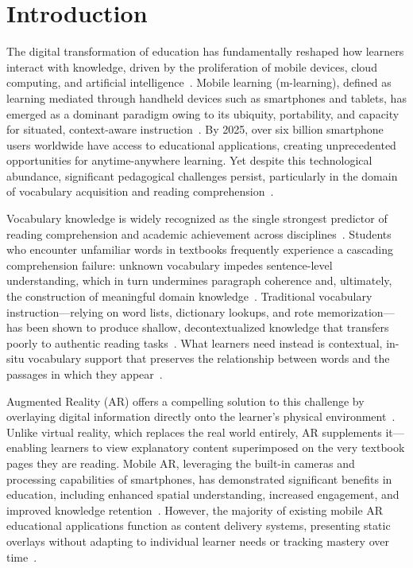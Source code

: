 \section{Introduction}
\label{sec:introduction}

The digital transformation of education has fundamentally reshaped how learners interact with knowledge, driven by the proliferation of mobile devices, cloud computing, and artificial intelligence~\cite{Crompton2017,Sharples2015}. Mobile learning (m-learning), defined as learning mediated through handheld devices such as smartphones and tablets, has emerged as a dominant paradigm owing to its ubiquity, portability, and capacity for situated, context-aware instruction~\cite{Kukulska2009,Chee2017}. By 2025, over six billion smartphone users worldwide have access to educational applications, creating unprecedented opportunities for anytime-anywhere learning. Yet despite this technological abundance, significant pedagogical challenges persist, particularly in the domain of vocabulary acquisition and reading comprehension~\cite{Nation2013,Schmitt2008}.

Vocabulary knowledge is widely recognized as the single strongest predictor of reading comprehension and academic achievement across disciplines~\cite{Stahl2005,Nation2013}. Students who encounter unfamiliar words in textbooks frequently experience a cascading comprehension failure: unknown vocabulary impedes sentence-level understanding, which in turn undermines paragraph coherence and, ultimately, the construction of meaningful domain knowledge~\cite{Laufer2010}. Traditional vocabulary instruction---relying on word lists, dictionary lookups, and rote memorization---has been shown to produce shallow, decontextualized knowledge that transfers poorly to authentic reading tasks~\cite{Schmitt2008,Webb2007}. What learners need instead is contextual, in-situ vocabulary support that preserves the relationship between words and the passages in which they appear~\cite{Hulstijn2001}.

Augmented Reality (AR) offers a compelling solution to this challenge by overlaying digital information directly onto the learner's physical environment~\cite{Azuma1997,Wu2013}. Unlike virtual reality, which replaces the real world entirely, AR supplements it---enabling learners to view explanatory content superimposed on the very textbook pages they are reading. Mobile AR, leveraging the built-in cameras and processing capabilities of smartphones, has demonstrated significant benefits in education, including enhanced spatial understanding, increased engagement, and improved knowledge retention~\cite{Akcayir2017,Ibanez2018,Garzon2019}. However, the majority of existing mobile AR educational applications function as content delivery systems, presenting static overlays without adapting to individual learner needs or tracking mastery over time~\cite{Bacca2014,Garzon2019}.

